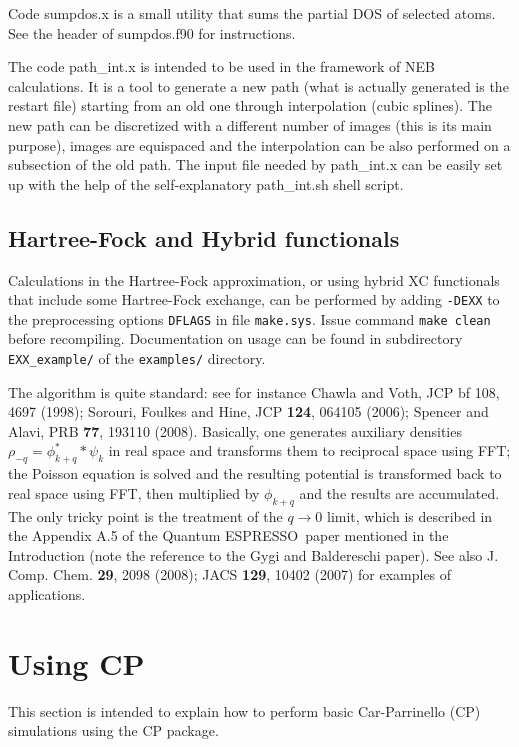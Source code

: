 \documentclass[12pt,a4paper]{article}
\def\qe{{\sc Quantum ESPRESSO}}
\begin{document}
Code sumpdos.x is a small utility that sums the partial DOS of
selected atoms. See the header of  sumpdos.f90 for instructions.

The code path\_int.x is intended to be used in the framework of NEB
calculations. It is a tool to generate a new path (what is actually
generated is the restart file) starting from an old one through
interpolation (cubic splines). The new path can be discretized with a
different number of images (this is its main purpose), images are
equispaced and the interpolation can be also 
performed on a subsection of the old path. The input file needed by
path\_int.x can be easily set up  with the help of the self-explanatory
path\_int.sh shell script. 

\subsection{Hartree-Fock and Hybrid functionals}

Calculations in the Hartree-Fock approximation, or using hybrid XC functionals 
that include some Hartree-Fock exchange, can be performed by adding
\texttt{-DEXX} to the preprocessing options \texttt{DFLAGS} in file 
\texttt{make.sys}. Issue command \texttt{make clean} before recompiling. 
Documentation on usage can be found in subdirectory \texttt{EXX\_example/}
of the \texttt{examples/} directory.

The algorithm is quite standard: see for instance Chawla and Voth, 
JCP {bf 108}, 4697 (1998); Sorouri, Foulkes and Hine, JCP {\bf 124}, 
064105 (2006); Spencer and Alavi, PRB {\bf 77}, 193110 (2008). 
Basically, one generates auxiliary densities $\rho_{-q}=\phi^{*}_{k+q}*\psi_k$
in real space and transforms them to reciprocal space using FFT;
the Poisson equation is solved and the resulting potential is transformed 
back to real space using FFT, then multiplied by $\phi_{k+q}$ and the
results are accumulated.
The only tricky point is the treatment of the $q\rightarrow 0$ limit,
which is described in the Appendix A.5 of the \qe\ paper mentioned 
in the Introduction (note the reference to the Gygi and Baldereschi paper). 
See also J. Comp. Chem. {\bf 29}, 2098 (2008);
JACS {\bf 129}, 10402 (2007) for examples of applications.

\section{Using CP}

This section is intended to explain how to perform basic Car-Parrinello (CP)
simulations using the CP package.
    
\end{document}

